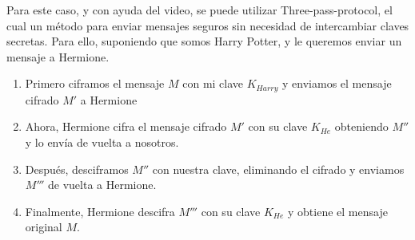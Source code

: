 \begin{enumerate}
Para este caso, y con ayuda del video, se puede utilizar Three-pass-protocol, el cual un método para enviar mensajes seguros sin necesidad de intercambiar claves secretas. Para ello, suponiendo que somos Harry Potter, y le queremos enviar un mensaje a Hermione.
\begin{enumerate}
\item Primero ciframos el mensaje $M$ con mi clave $ K_{Harry}$ y enviamos el mensaje cifrado $M'$ a Hermione
\item Ahora, Hermione cifra el mensaje cifrado $ M' $ con su clave $ K_{He} $ obteniendo $ M''$ y lo envía de vuelta a nosotros.
\item  Después, desciframos  $ M'' $ con nuestra clave, eliminando el cifrado y enviamos $ M''' $  de vuelta a Hermione.
\item Finalmente, Hermione descifra $M''' $ con su clave $ K_{He} $ y obtiene el mensaje original $ M $.
\end{enumerate}


\end{enumerate}